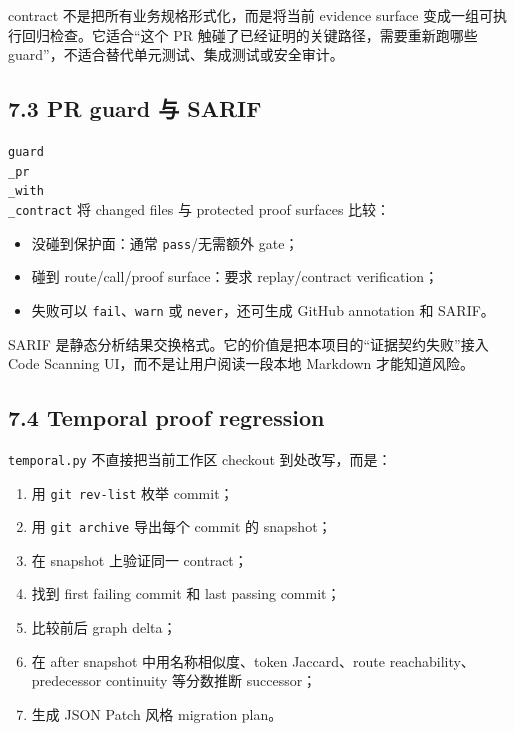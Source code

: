 \documentclass[UTF8,12pt,openany]{ctexbook}
\begin{document}
contract 不是把所有业务规格形式化，而是将当前 evidence surface 变成一组可执行回归检查。它适合“这个 PR 触碰了已经证明的关键路径，需要重新跑哪些 guard”，不适合替代单元测试、集成测试或安全审计。\par

\subsection{7.3 PR guard 与 SARIF}

\texttt{guard\\_pr\\_with\\_contract} 将 changed files 与 protected proof surfaces 比较：\par

\begin{itemize}
\item 没碰到保护面：通常 \texttt{pass}/无需额外 gate；
\item 碰到 route/call/proof surface：要求 replay/contract verification；
\item 失败可以 \texttt{fail}、\texttt{warn} 或 \texttt{never}，还可生成 GitHub annotation 和 SARIF。
\end{itemize}

SARIF 是静态分析结果交换格式。它的价值是把本项目的“证据契约失败”接入 Code Scanning UI，而不是让用户阅读一段本地 Markdown 才能知道风险。\par

\subsection{7.4 Temporal proof regression}

\texttt{temporal.py} 不直接把当前工作区 checkout 到处改写，而是：\par

\begin{enumerate}
\item 用 \texttt{git rev-list} 枚举 commit；
\item 用 \texttt{git archive} 导出每个 commit 的 snapshot；
\item 在 snapshot 上验证同一 contract；
\item 找到 first failing commit 和 last passing commit；
\item 比较前后 graph delta；
\item 在 after snapshot 中用名称相似度、token Jaccard、route reachability、predecessor continuity 等分数推断 successor；
\item 生成 JSON Patch 风格 migration plan。
\end{enumerate}
\end{document}
